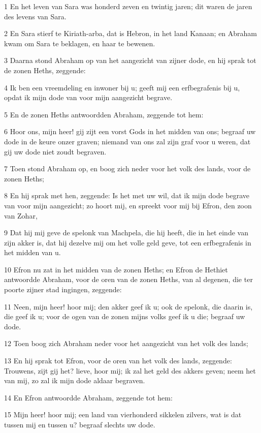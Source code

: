 \par 1 En het leven van Sara was honderd zeven en twintig jaren; dit waren de jaren des levens van Sara.
\par 2 En Sara stierf te Kiriath-arba, dat is Hebron, in het land Kanaan; en Abraham kwam om Sara te beklagen, en haar te bewenen.
\par 3 Daarna stond Abraham op van het aangezicht van zijner dode, en hij sprak tot de zonen Heths, zeggende:
\par 4 Ik ben een vreemdeling en inwoner bij u; geeft mij een erfbegrafenis bij u, opdat ik mijn dode van voor mijn aangezicht begrave.
\par 5 En de zonen Heths antwoordden Abraham, zeggende tot hem:
\par 6 Hoor ons, mijn heer! gij zijt een vorst Gods in het midden van ons; begraaf uw dode in de keure onzer graven; niemand van ons zal zijn graf voor u weren, dat gij uw dode niet zoudt begraven.
\par 7 Toen stond Abraham op, en boog zich neder voor het volk des lands, voor de zonen Heths;
\par 8 En hij sprak met hen, zeggende: Is het met uw wil, dat ik mijn dode begrave van voor mijn aangezicht; zo hoort mij, en spreekt voor mij bij Efron, den zoon van Zohar,
\par 9 Dat hij mij geve de spelonk van Machpela, die hij heeft, die in het einde van zijn akker is, dat hij dezelve mij om het volle geld geve, tot een erfbegrafenis in het midden van u.
\par 10 Efron nu zat in het midden van de zonen Heths; en Efron de Hethiet antwoordde Abraham, voor de oren van de zonen Heths, van al degenen, die ter poorte zijner stad ingingen, zeggende:
\par 11 Neen, mijn heer! hoor mij; den akker geef ik u; ook de spelonk, die daarin is, die geef ik u; voor de ogen van de zonen mijns volks geef ik u die; begraaf uw dode.
\par 12 Toen boog zich Abraham neder voor het aangezicht van het volk des lands;
\par 13 En hij sprak tot Efron, voor de oren van het volk des lands, zeggende: Trouwens, zijt gij het? lieve, hoor mij; ik zal het geld des akkers geven; neem het van mij, zo zal ik mijn dode aldaar begraven.
\par 14 En Efron antwoordde Abraham, zeggende tot hem:
\par 15 Mijn heer! hoor mij; een land van vierhonderd sikkelen zilvers, wat is dat tussen mij en tussen u? begraaf slechts uw dode.
